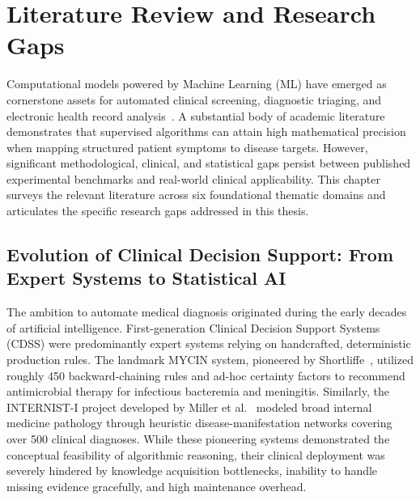 \chapter{Literature Review and Research Gaps}
\label{chap:literature_review}

Computational models powered by Machine Learning (ML) have emerged as cornerstone assets for automated clinical screening, diagnostic triaging, and electronic health record analysis~\cite{shortliffe2018clinical, topol2019high}. A substantial body of academic literature demonstrates that supervised algorithms can attain high mathematical precision when mapping structured patient symptoms to disease targets. However, significant methodological, clinical, and statistical gaps persist between published experimental benchmarks and real-world clinical applicability. This chapter surveys the relevant literature across six foundational thematic domains and articulates the specific research gaps addressed in this thesis.

\section{Evolution of Clinical Decision Support: From Expert Systems to Statistical AI}
\label{sec:cdss_evolution}

The ambition to automate medical diagnosis originated during the early decades of artificial intelligence. First-generation Clinical Decision Support Systems (CDSS) were predominantly expert systems relying on handcrafted, deterministic production rules. The landmark MYCIN system, pioneered by Shortliffe~\cite{shortliffe1976computer}, utilized roughly 450 backward-chaining rules and ad-hoc certainty factors to recommend antimicrobial therapy for infectious bacteremia and meningitis. Similarly, the INTERNIST-I project developed by Miller et al.~\cite{miller1982internist} modeled broad internal medicine pathology through heuristic disease-manifestation networks covering over 500 clinical diagnoses. While these pioneering systems demonstrated the conceptual feasibility of algorithmic reasoning, their clinical deployment was severely hindered by knowledge acquisition bottlenecks, inability to handle missing evidence gracefully, and high maintenance overhead.

